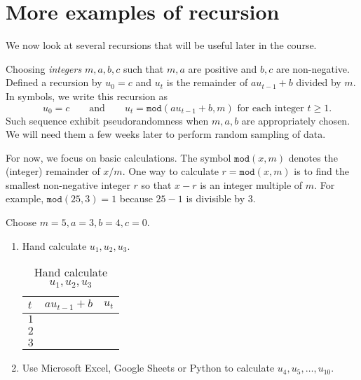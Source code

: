 \documentclass[../main.tex]{subfiles}
\begin{document}
 \section{More examples of recursion}

We now look at several recursions that will be useful later in the course.
\begin{example} \label{ex:pseudorandom-number-generator}
  Choosing \emph{integers} \(m,a,b,c\) such that \(m,a\) are positive and \(b,c\) are non-negative. Defined a recursion by \(u_{0} = c\) and \(u_{t}\) is the remainder of \(a u_{t-1} + b\) divided by \(m\). In symbols, we write this recursion as
  \[
    \quad u_{0} = c \qquad\text{and}\qquad u_{t} = \mathtt{mod}(a u_{t-1} + b, m) \text{ for each integer } t \ge 1.
  \]
  Such sequence exhibit pseudorandomness when \(m,a,b\) are appropriately chosen. We will need them a few weeks later to perform random sampling of data.

  For now, we focus on basic calculations. The symbol \(\texttt{mod}(x,m)\) denotes the (integer) remainder of \(x/m\). One way to calculate \(r = \mathtt{mod}(x,m)\) is to find the smallest non-negative integer \(r\) so that \(x - r\) is an integer multiple of \(m\). For example, \(\texttt{mod}(25, 3) = 1\) because \(25 - 1\) is divisible by \(3\).

  Choose \(m = 5, a = 3, b = 4, c = 0\).
  \begin{enumerate}
    \item Hand calculate \(u_{1}, u_{2}, u_{3}\). 
      \begin{table}[H] %
        \centering

        \begin{tabular}{l|p{2in}|p{1in}}  %
          \(t\) & \(a u_{t-1} + b\) & \(u_{t}\) \\ %
          \midrule
          \(1\) & & \\[1ex]\midrule
          \(2\) & & \\[1ex]\midrule
          \(3\) & & \\[1ex]
          \bottomrule
        \end{tabular}
        \caption{Hand calculate \(u_{1}, u_{2}, u_{3}\)}
        \label{table:table}
      \end{table}
    \item Use Microsoft Excel, Google Sheets or Python to calculate \(u_{4}, u_{5}, \ldots, u_{10}\).  


\end{enumerate}
\end{example}
\end{document}

